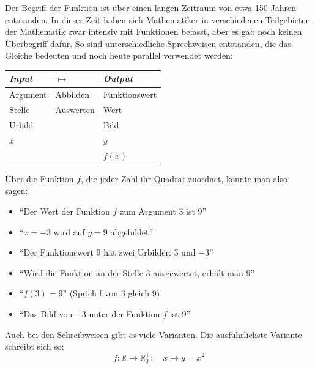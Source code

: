 Der Begriff der Funktion ist über einen langen Zeitraum von etwa
150 Jahren entstanden. In dieser Zeit haben sich Mathematiker in
verschiedenen Teilgebieten der Mathematik zwar intensiv mit Funktionen
befasst, aber es gab noch keinen Überbegriff dafür. So sind
unterschiedliche Sprechweisen entstanden, die das Gleiche bedeuten
und noch heute parallel verwendet werden:

\begin{center}
    \renewcommand{\arraystretch}{1.5}
    \begin{tabular}{|p{}|p{}|p{}|}
        \hline
        \emph{Input} & \centering\(\longmapsto\)\arraybackslash
                     & \emph{Output}                                            \\ \hline
        Argument     & Abbilden                                 & Funktionswert \\
        Stelle       & Auswerten                                & Wert          \\
        Urbild       &                                          & Bild          \\
        \(x\)        &                                          & \(y\)         \\
                     &                                          & \(f(x)\)      \\ \hline
    \end{tabular}
\end{center}

Über die Funktion \(f\), die jeder Zahl ihr Quadrat zuordnet,
könnte man also sagen:

\begin{itemize}
    \item \enquote{Der Wert der Funktion \(f\) zum Argument \(3\) ist \(9\)}
    \item \enquote{\(x=-3\) wird auf \(y=9\) abgebildet}
    \item \enquote{Der Funktionswert \(9\) hat zwei Urbilder: \(3\) und \(-3\)}
    \item \enquote{Wird die Funktion an der Stelle \(3\) ausgewertet, erhält man \(9\)}
    \item \enquote{\(f(3)=9\)} (Sprich f von 3 gleich 9)
    \item \enquote{Das Bild von \(-3\) unter der Funktion \(f\) ist \(9\)}
\end{itemize}

Auch bei den Schreibweisen gibt es viele Varianten.
Die ausführlichste Variante schreibt sich so:
\[
    f\colon \mathbb{R}\longrightarrow\mathbb{R}_0^+;
    \quad x\longmapsto y=x^2
\]

